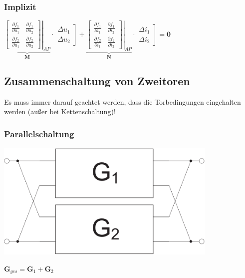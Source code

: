 \documentclass[a4paper,twocolumn,10pt]{article}
\begin{document}
\subsubsection*{Implizit}
$\underbrace{\left.\begin{bmatrix}\frac{\partial f_1}{\partial u_1} & \frac{\partial f_1}{\partial u_2}\\ \frac{\partial f_2}{\partial u_1} & \frac{\partial f_2}{\partial u_2}\end{bmatrix}\right|_{AP}}_{\textbf{M}}\cdot \left.\begin{matrix}\Delta u_1\\ \Delta u_2\end{matrix}\right]+ \underbrace{\left.\begin{bmatrix}\frac{\partial f_1}{\partial i_1} & \frac{\partial f_1}{\partial i_2}\\ \frac{\partial f_2}{\partial i_1} & \frac{\partial f_2}{\partial i_2}\end{bmatrix}\right|_{AP}}_{\textbf{N}}\cdot \left.\begin{matrix}\Delta i_1\\ \Delta i_2\end{matrix}\right]=\textbf{0}$

\subsection*{Zusammenschaltung von Zweitoren}
Es muss immer darauf geachtet werden, dass die Torbedingungen eingehalten werden (außer bei Kettenschaltung)!
\subsubsection*{Parallelschaltung}
\begin{minipage}[b]{0.23\textwidth}
\includegraphics[width=0.8\textwidth]{img/Zweitor_Parallel}
\end{minipage}
\hfill
\begin{minipage}[b]{0.23\textwidth}
$\textbf{G}_{ges}=\textbf{G}_1+\textbf{G}_2$\\\\
\end{minipage}
\end{document}
